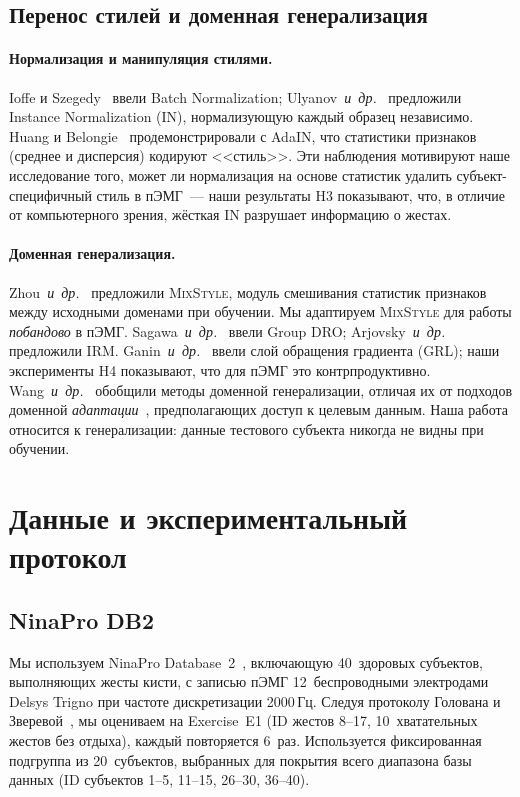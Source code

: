 \documentclass[conference]{IEEEtran}
\newcommand{\etal}{\mbox{\textit{и~др.}}}
\newcommand{\mixstyle}{\textsc{MixStyle}}
\begin{document}
\subsection{Перенос стилей и доменная генерализация}

\paragraph{Нормализация и манипуляция стилями.}
Ioffe и Szegedy~\cite{ioffe2015batch} ввели Batch Normalization; Ulyanov~\etal~\cite{ulyanov2016instance} предложили Instance Normalization (IN), нормализующую каждый образец независимо.
Huang и Belongie~\cite{huang2017adain} продемонстрировали с AdaIN, что статистики признаков (среднее и дисперсия) кодируют <<стиль>>.
Эти наблюдения мотивируют наше исследование того, может ли нормализация на основе статистик удалить субъект-специфичный стиль в пЭМГ~--- наши результаты H3 показывают, что, в отличие от компьютерного зрения, жёсткая IN разрушает информацию о жестах.

\paragraph{Доменная генерализация.}
Zhou~\etal~\cite{zhou2021mixstyle} предложили \mixstyle{}, модуль смешивания статистик признаков между исходными доменами при обучении.
Мы адаптируем \mixstyle{} для работы \emph{побандово} в пЭМГ.
Sagawa~\etal~\cite{sagawa2020distributionally} ввели Group DRO; Arjovsky~\etal~\cite{arjovsky2019invariant} предложили IRM.
Ganin~\etal~\cite{ganin2016domain} ввели слой обращения градиента (GRL); наши эксперименты H4 показывают, что для пЭМГ это контрпродуктивно.
Wang~\etal~\cite{wang2022generalizing} обобщили методы доменной генерализации, отличая их от подходов доменной \emph{адаптации}~\cite{du2017surface, ketyko2019domain}, предполагающих доступ к целевым данным.
Наша работа относится к генерализации: данные тестового субъекта никогда не видны при обучении.

\section{Данные и экспериментальный протокол}
\label{sec:dataset}

\subsection{NinaPro DB2}
Мы используем NinaPro Database~2~\cite{atzori2014electromyography}, включающую 40~здоровых субъектов, выполняющих жесты кисти, с записью пЭМГ 12~беспроводными электродами Delsys Trigno при частоте дискретизации 2000\,Гц.
Следуя протоколу Голована и Зверевой~\cite{golovan2025benchmark}, мы оцениваем на Exercise~E1 (ID жестов 8--17, 10~хватательных жестов без отдыха), каждый повторяется 6~раз.
Используется фиксированная подгруппа из 20~субъектов, выбранных для покрытия всего диапазона базы данных (ID субъектов 1--5, 11--15, 26--30, 36--40).
\end{document}

